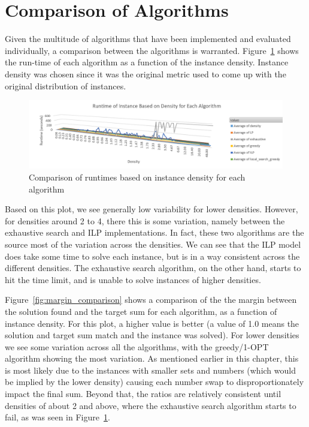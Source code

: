\documentclass{report}
\begin{document}
\section{Comparison of Algorithms}
Given the multitude of algorithms that have been implemented and evaluated individually, a comparison between the algorithms
is warranted. Figure~\ref{fig:runtime_comparison} shows the run-time of each algorithm as a function of the instance density.
Instance density was chosen since it was the original metric used to come up with the original distribution of instances.

\begin{figure}[h]
  \centering
  \includegraphics[width=16cm]{runtime_comparison.png}
  \caption{Comparison of runtimes based on instance density for each algorithm}
  \label{fig:runtime_comparison}
\end{figure}

Based on this plot, we see generally low variability for lower densities. However, for densities around 2 to 4, there
this is some variation, namely between the exhaustive search and ILP implementations. In fact, these two algorithms
are the source most of the variation across the densities. We can see that the ILP model does take some time to solve
each instance, but is in a way consistent across the different densities. The exhaustive search algorithm, on the
other hand, starts to hit the time limit, and is unable to solve instances of higher densities. 

Figure~\ref{fig:margin_comparison} shows a comparison of the the margin between the solution found and the target sum for
each algorithm, as a function of instance density. For this plot, a higher value is better (a value of 1.0 means the solution
and target sum match and the instance was solved). For lower densities we see some variation across all the algorithms, with the
greedy/1-OPT algorithm showing the most variation. As mentioned earlier in this chapter, this is most likely
due to the instances with smaller sets and numbers (which would be implied by the lower density) causing each number swap
to disproportionately impact the final sum. Beyond that, the ratios are relatively consistent until densities of about 2 and above,
where the exhaustive search algorithm starts to fail, as was seen in Figure~\ref{fig:runtime_comparison}.
\end{document}
